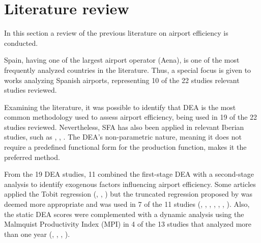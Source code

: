 
\section{Literature review}
\label{sec:backg}
In this section a review of the previous literature on airport efficiency is conducted.

Spain, having one of the largest airport operator (Aena), is one of the most frequently analyzed countries in the literature. Thus, a special focus is given to works analyzing Spanish airports, representing 10 of the 22 studies relevant studies reviewed.

Examining the literature, it was possible to identify that DEA is the most common methodology used to assess airport efficiency, being used in 19 of the 22 studies reviewed. Nevertheless, SFA has also been applied in relevant Iberian studies, such as \cite{barros2008}, \cite{tovar2010}, \cite{martin2011}. The DEA's non-parametric nature, meaning it does not require a predefined functional form for the production function, makes it the preferred method. 

From the 19 DEA studies, 11 combined the first-stage DEA with a second-stage analysis to identify exogenous factors influencing airport efficiency. Some articles applied the Tobit regression (\cite{coto-millan2014}, \cite{fragoudaki2016}, \cite{coto-millan2016}) but the truncated regression proposed by \cite{simar2007} was deemed more appropriate and was used in 7 of the 11 studies (\cite{barrosdieke2008}, \cite{barros2008b}, \cite{tsekeris2011}, \cite{chang2013}, \cite{adler2013}, \cite{fernandez2022}, \cite{cifuentes-faura2023}).
Also, the static DEA scores were complemented with a dynamic analysis using the Malmquist Productivity Index (MPI) in 4 of the 13 studies that analyzed more than one year (\cite{fung2008}, \cite{tovar2010}, \cite{coto-millan2014}, \cite{inglada2018}).

